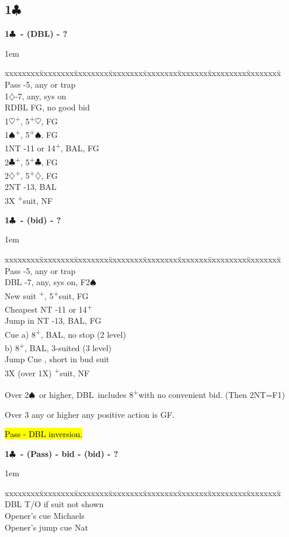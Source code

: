 \documentclass[10pt]{article}
\renewcommand{\c}{$\clubsuit$}
\renewcommand{\d}{$\diamondsuit$}
\newcommand{\h}{$\heartsuit$}
\newcommand{\s}{$\spadesuit$}
\newcommand{\p}{\textsuperscript{+}}
\newcommand{\x}{DBL}
\newcommand{\xx}{RDBL}
\newenvironment{bidtable}[1][]
{\textbf{#1}
  \begin{adjustwidth}{1em}{}
    \addvspace{2pt}
    \begin{tabbing}
      xxxxxxxx\=xxxxxxxx\=xxxxxxxx\=xxxxxxxx\=xxxxxxxx\=xxxxxxx\=xxxxxxxxx\=xxxxxxxx\=\kill}
{\end{tabbing}\end{adjustwidth}\bigskip}%
\newcommand{\pdfc}{\texorpdfstring{\c{}}{C}}
\begin{document}
\subsection{1\pdfc}
\begin{bidtable}[1\c\ - (\x) - ?]
Pass -5, any or trap                   \\
1\d  {}-7, any, sys on                   \\
\xx  \> FG, no good bid       \\
1\h  {}\p, 5\p\h, FG        \\
1\s  {}\p, 5\p\s, FG        \\
1NT  -11 or 14\p, BAL, FG \\
2\c  {}\p, 5\p\c, FG        \\
2\d  {}\p, 5\p\d, FG            \\
2NT  -13, BAL            \\
3X   \p suit, NF
\end{bidtable}

\begin{bidtable}[1\c\ - (bid) - ?]
Pass         \>  -5, any or trap                \\
\x           \>  -7, any, sys on, F2\s                \\
New suit     \>  \p, 5\p suit, FG               \\
Cheapest NT  \>  -11 or 14\p                    \\
Jump in NT   \>  -13, BAL, FG                  \\
Cue          \>  \> a) 8\p, BAL, no stop (2 level)  \\
             \>  \> b) 8\p, BAL, 3-suited (3 level) \\
Jump Cue     \>  , short in bud suit         \\
3X (over 1X) \>  \p suit, NF
\end{bidtable}

Over 2\s\ or higher, \x\ includes 8\p with no convenient bid. (Then 2NT=F1)

Over 3 any or higher any positive action is GF.

\hl{Pass - DBL inversion.}

\begin{bidtable}[1\c\ - (Pass) - bid - (bid) - ?]
\x                \>  \> T/O if suit not shown \\
Opener's cue      \>  \> Michaels              \\
Opener's jump cue \>  \> Nat
\end{bidtable}
\end{document}
